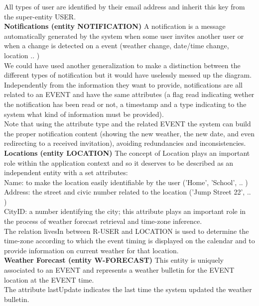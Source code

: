 \documentclass[12pt]{book}
\begin{document}
All types of user are identified by their email address and inherit this key from the super-entity USER.\\

\textbf{Notifications (entity NOTIFICATION)}
A notification is a message automatically generated by the system when some user invites another user or when a change is detected on a event (weather change, date/time change, location .. )\\

We could have used another generalization to make a distinction between the different types of notification but it would have uselessly messed up the diagram.\\

Independently from the information they want to provide, notifications are all related to an EVENT and have the same attributes (a flag read indicating wether the notification has been read or not, a timestamp and a type indicating to the system what kind of information must be provided). \\
Note that using the attribute type  and the related EVENT the system can build the proper notification content (showing the new weather, the new date, and even redirecting to a received invitation), avoiding redundancies and inconsistencies.\\

\textbf{Locations (entity LOCATION)}
The concept of Location plays an important role within the application context and so it deserves to be described as an independent entity with a set attributes:\\
Name: to make the location easily identifiable by the user ('Home', 'School', .. )\\
Address: the street and civic number related to the location ('Jump Street 22', .. )\\
CityID: a number identifying the city; this attribute plays an important role in the process of weather forecast retrieval and time-zone inference.\\
The relation livesIn between R-USER and LOCATION is used to determine the time-zone according to which the event timing is displayed on the calendar and to provide information on current weather for that location.\\


\textbf{Weather Forecast (entity W-FORECAST)}
This entity is uniquely associated to an EVENT and represents a weather bulletin for the EVENT location at the EVENT time. \\
The attribute lastUpdate indicates the last time the system updated the weather bulletin.\\
\end{document}
